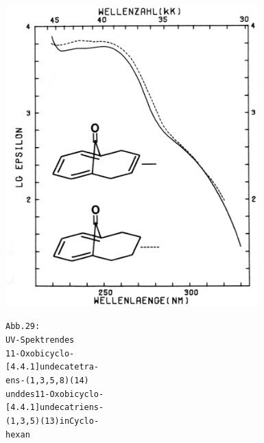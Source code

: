 \documentclass[a4paper,11pt]{article}
\begin{document}
\begin{minipage}{10.5cm}
  \includegraphics[width=9.75cm]{UV_029}
\end{minipage}%
\begin{minipage}{0.3\textwidth}
\begin{alltt}
Abb. 29:
UV-Spektren des
11-Oxobicyclo-
[4.4.1]undecatetra-
ens-(1,3,5‚8) (14)
und des 11-Oxobicyclo-
[4.4.1]undecatriens-
(1,3,5) (13) in Cyclo-
hexan
\end{alltt}
\end{minipage}
\end{document}
